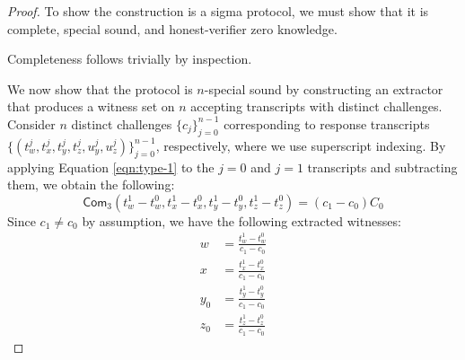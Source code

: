 \documentclass{article}
\newcommand{\func}[1]{\mathsf{#1}}
\newcommand{\com}{\func{Com}}
\begin{document}
\begin{proof}
To show the construction is a sigma protocol, we must show that it is complete, special sound, and honest-verifier zero knowledge.

Completeness follows trivially by inspection.

We now show that the protocol is $n$-special sound by constructing an extractor that produces a witness set on $n$ accepting transcripts with distinct challenges.
Consider $n$ distinct challenges $\{c_j\}_{j=0}^{n-1}$ corresponding to response transcripts $\{(t_w^j, t_x^j, t_y^j, t_z^j, u_y^j, u_z^j)\}_{j=0}^{n-1}$, respectively, where we use superscript indexing.
By applying Equation \ref{eqn:type-1} to the $j = 0$ and $j = 1$ transcripts and subtracting them, we obtain the following:
$$\com_3(t_w^1 - t_w^0, t_x^1 - t_x^0, t_y^1 - t_y^0, t_z^1 - t_z^0) = (c_1 - c_0)C_0$$
Since $c_1 \neq c_0$ by assumption, we have the following extracted witnesses:
\begin{align*}
    w &= \frac{t_w^1 - t_w^0}{c_1 - c_0} \\
    x &= \frac{t_x^1 - t_x^0}{c_1 - c_0} \\
    y_0 &= \frac{t_y^1 - t_y^0}{c_1 - c_0} \\
    z_0 &= \frac{t_z^1 - t_z^0}{c_1 - c_0}
\end{align*}


\end{proof}
\end{document}
